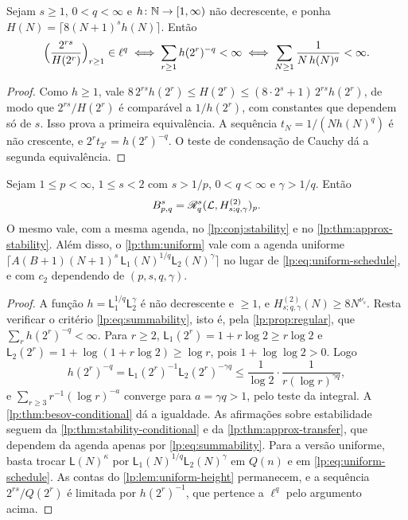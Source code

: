 \documentclass[12pt,a4paper]{article}
\begin{document}
\begin{proposicao}
\label{lp:prop:regular}
Sejam $s\ge1$, $0<q<\infty$ e $h\colon\mathbb N\to[1,\infty)$ não decrescente, e ponha $H(N)=\lceil8(N+1)^{s}h(N)\rceil$. Então
\[
 \Bigl(\frac{2^{rs}}{H(2^r)}\Bigr)_{r\ge1}\in\ell^q
 \iff\sum_{r\ge1}h(2^r)^{-q}<\infty
 \iff\sum_{N\ge1}\frac1{N\,h(N)^q}<\infty .
\]
\end{proposicao}

\begin{proof}
Como $h\ge1$, vale $8\,2^{rs}h(2^r)\le H(2^r)\le(8\cdot2^s+1)\,2^{rs}h(2^r)$, de modo que $2^{rs}/H(2^r)$ é comparável a $1/h(2^r)$, com constantes que dependem só de $s$. Isso prova a primeira equivalência. A sequência $t_N=1/(Nh(N)^q)$ é não crescente, e $2^rt_{2^r}=h(2^r)^{-q}$. O teste de condensação de Cauchy dá a segunda equivalência.
\end{proof}

\begin{corolario}
\label{lp:cor:loglog}
Sejam $1\le p<\infty$, $1\le s<2$ com $s>1/p$, $0<q<\infty$ e $\gamma>1/q$. Então
\[
 B^{s}_{p,q}=\mathscr R^{s}_{q}(\mathcal L,H^{(2)}_{s;q,\gamma})_p .
\]
O mesmo vale, com a mesma agenda, no \cref{lp:conj:stability} e no \cref{lp:thm:approx-stability}. Além disso, o \cref{lp:thm:uniform} vale com a agenda uniforme $\lceil A(B+1)(N+1)^s\,\mathsf L_1(N)^{1/q}\mathsf L_2(N)^{\gamma}\rceil$ no lugar de \eqref{lp:eq:uniform-schedule}, e com $c_2$ dependendo de $(p,s,q,\gamma)$.
\end{corolario}

\begin{proof}
A função $h=\mathsf L_1^{1/q}\mathsf L_2^{\gamma}$ é não decrescente e $\ge1$, e $H^{(2)}_{s;q,\gamma}(N)\ge8N^{\nu_s}$. Resta verificar o critério \eqref{lp:eq:summability}, isto é, pela \cref{lp:prop:regular}, que $\sum_rh(2^r)^{-q}<\infty$. Para $r\ge2$, $\mathsf L_1(2^r)=1+r\log2\ge r\log2$ e $\mathsf L_2(2^r)=1+\log(1+r\log2)\ge\log r$, pois $1+\log\log2>0$. Logo
\[
 h(2^r)^{-q}=\mathsf L_1(2^r)^{-1}\mathsf L_2(2^r)^{-\gamma q}\le\frac1{\log2}\cdot\frac1{r(\log r)^{\gamma q}},
\]
e $\sum_{r\ge3}r^{-1}(\log r)^{-a}$ converge para $a=\gamma q>1$, pelo teste da integral. A \cref{lp:thm:besov-conditional} dá a igualdade. As afirmações sobre estabilidade seguem da \cref{lp:thm:stability-conditional} e da \cref{lp:thm:approx-transfer}, que dependem da agenda apenas por \eqref{lp:eq:summability}. Para a versão uniforme, basta trocar $\mathsf L(N)^\kappa$ por $\mathsf L_1(N)^{1/q}\mathsf L_2(N)^{\gamma}$ em $Q(n)$ e em \eqref{lp:eq:uniform-schedule}. As contas do \cref{lp:lem:uniform-height} permanecem, e a sequência $2^{rs}/Q(2^r)$ é limitada por $h(2^r)^{-1}$, que pertence a $\ell^q$ pelo argumento acima.
\end{proof}
\end{document}
